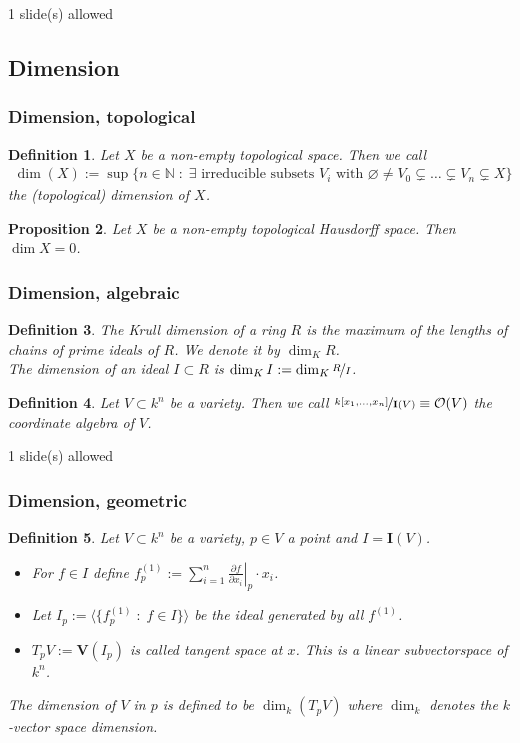 \documentclass[11pt,a4paper,english]{scrartcl}
\newtheorem{defn}{Definition}
\newtheorem{prop}[defn]{Proposition}
\newcommand{\V}{\mathbf{V}}
\newcommand{\I}{\mathbf{I}}
\newcommand{\mvar}[2]{#1_1,\ldots , #1_{#2}}
\newcommand{\kxn}{k[\mvar{x}{n}]}
\newcommand{\needSlides}[1]{\newpage \begin{needSl}#1 slide(s) allowed\end{needSl}}
\begin{document}
\needSlides{1}
\subsection{Dimension}

\subsubsection{Dimension, topological}
\begin{defn} Let $X$ be a non-empty topological space. Then we call
\begin{align*}
\dim (X) := \sup \{ n\in \mathbb{N} \; : \;   \exists \text{ irreducible subsets } V_i \text{ with } \varnothing \neq V_0 \subsetneq \ldots \subsetneq V_n \subsetneq X  \}
\end{align*}
the \emph{(topological) dimension} of $X$.
\end{defn}
\begin{prop}
Let $X$  be a non-empty topological Hausdorff space. Then $\dim X = 0$.
\end{prop}
\subsubsection{Dimension, algebraic}
\begin{defn}
The \emph{Krull dimension} of a ring $R$ is the maximum of the lengths of chains of prime ideals of $R$. We denote it by $\dim_K R$.\\
The dimension of an ideal $I \subset R$ is $\dim_K I := \dim_K \nicefrac{R}{I}$.
\end{defn}

\begin{defn}
Let $V\subset k^n$ be a variety. Then we call $\nicefrac{\kxn }{\I (V)} \equiv \mathcal{O}(V)$ the \emph{coordinate algebra} of $V$. 
\end{defn}

\needSlides{1}
\subsubsection{Dimension, geometric}
\begin{defn}
Let $V\subset k^n$ be a variety, $p\in V $ a point and $I=\I (V)$.
\begin{itemize}
\item For $f\in I$ define $f_p^{(1)} :=\left. \sum_{i=1}^n \frac{\partial f}{\partial x_i}\right|_p \cdot x_i$.
\item Let $I_p := \langle \{ f_p^{(1)} \; : \;  f\in I\} \rangle$ be the ideal generated by all $f^{(1)}$.
\item $T_p V := \V (I_p)$ is called tangent space at $x$. This is a linear subvectorspace of $k^n$.
\end{itemize}
The \emph{dimension of $V$ in $p$} is defined to be  $\dim_k (T_p V)$ where $\dim_k$ denotes the $k$-vector space dimension. 
\end{defn}
\end{document}
